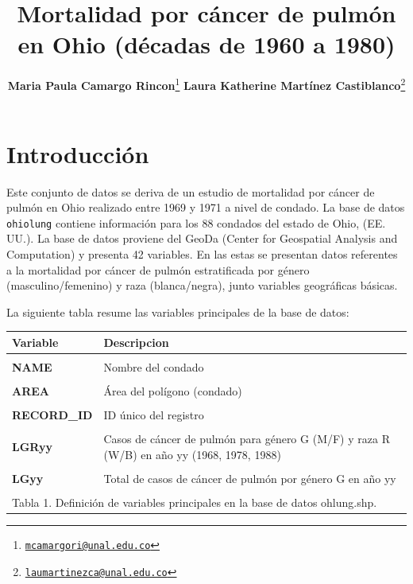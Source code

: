 \documentclass[
  12pt,
]{article}
\title{Mortalidad por cáncer de pulmón en Ohio (décadas de 1960 a 1980)}
\author{\textbf{Maria Paula Camargo Rincon}\footnote{\href{mailto:mcamargori@unal.edu.co}{\nolinkurl{mcamargori@unal.edu.co}}}
\textbf{Laura Katherine Martínez Castiblanco}\footnote{\href{mailto:laumartinezca@unal.edu.co}{\nolinkurl{laumartinezca@unal.edu.co}}}}
\date{}
\begin{document}
\maketitle

{
\setcounter{tocdepth}{3}
\tableofcontents
}
\section{Introducción}\label{PrInv}

Este conjunto de datos se deriva de un estudio de mortalidad por cáncer
de pulmón en Ohio realizado entre 1969 y 1971 a nivel de condado. La
base de datos \texttt{ohiolung} contiene información para los 88
condados del estado de Ohio, (EE. UU.). La base de datos proviene del
GeoDa (Center for Geospatial Analysis and Computation) y presenta 42
variables. En las estas se presentan datos referentes a la mortalidad
por cáncer de pulmón estratificada por género (masculino/femenino) y
raza (blanca/negra), junto variables geográficas básicas.

La siguiente tabla resume las variables principales de la base de datos:

\begingroup\fontsize{10}{12}\selectfont

\begin{longtable}[t]{>{}l>{\raggedright\arraybackslash}p{10cm}}
\toprule
Variable & Descripcion\\
\midrule
\textbf{\cellcolor{gray!10}{CountyID}} & \cellcolor{gray!10}{ID secuencial del condado (orden alfabético)}\\
\textbf{NAME} & Nombre del condado\\
\textbf{\cellcolor{gray!10}{FIPSNO}} & \cellcolor{gray!10}{Código FIPS del condado (numérico)}\\
\textbf{AREA} & Área del polígono (condado)\\
\textbf{\cellcolor{gray!10}{PERIMETER}} & \cellcolor{gray!10}{Perímetro del polígono (condado)}\\
\addlinespace
\textbf{RECORD\_ID} & ID único del registro\\
\textbf{\cellcolor{gray!10}{COUNTYID}} & \cellcolor{gray!10}{ID del condado}\\
\textbf{LGRyy} & Casos de cáncer de pulmón para género G (M/F) y raza R (W/B) en año yy (1968, 1978, 1988)\\
\textbf{\cellcolor{gray!10}{POPGRyy}} & \cellcolor{gray!10}{Población en riesgo para género G y raza R en año yy}\\
\textbf{LGyy} & Total de casos de cáncer de pulmón por género G en año yy\\
\addlinespace
\textbf{\cellcolor{gray!10}{POPGyy}} & \cellcolor{gray!10}{Población total en riesgo por género G en año yy}\\
\bottomrule
\multicolumn{2}{l}{\rule{0pt}{1em}Tabla 1. Definición de variables principales en la base de datos ohlung.shp.}\\
\end{longtable}
\endgroup{}
\end{document}
